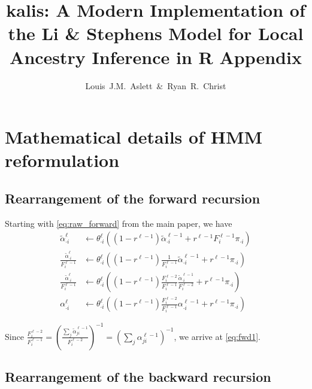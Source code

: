 \documentclass[a4paper]{article}
\title{kalis: A Modern Implementation of the Li \& Stephens Model for Local Ancestry Inference in R \newline Appendix}
\author{Louis~J.M.~Aslett~\&~Ryan~R.~Christ}
\date{}
\begin{document}
\maketitle
\appendix



\section{Mathematical details of HMM reformulation}
\label{mathematical-details-of-hmm-reformulation}



\subsection{Rearrangement of the forward recursion}
\label{apx:fwd}

Starting with \eqref{eq:raw_forward} from the main paper, we have
\begin{align}
	\tilde{\alpha}_{\cdot i}^{\ell} & \gets \theta^{\ell}_{\cdot i}  \left( \left(1-r^{\ell-1}\right) \tilde{\alpha}_{\cdot i}^{\ell-1} + r^{\ell-1} F_i^{\ell-1}  \pi_{\cdot i} \right) \nonumber \\
	\frac{\tilde{\alpha}_{\cdot i}^{\ell}}{ F_i^{\ell-1}} & \gets \theta^{\ell}_{\cdot i} \left( \left(1-r^{\ell-1}\right) \frac{1}{{ F_i^{\ell-1}}}\tilde{\alpha}_{\cdot i}^{\ell-1} + r^{\ell-1} \pi_{\cdot i} \right) \nonumber \\
	\frac{\tilde{\alpha}_{\cdot i}^{\ell}}{ F_i^{\ell-1}} & \gets \theta^{\ell}_{\cdot i} \left( \left(1-r^{\ell-1}\right) \frac{F_i^{\ell-2}}{{ F_i^{\ell-1}}} \frac{\tilde{\alpha}_{\cdot i}^{\ell-1}}{F_i^{\ell-2}} + r^{\ell-1} \pi_{\cdot i} \right) \nonumber \\
	\alpha_{\cdot i}^{\ell} & \gets \theta^{\ell}_{\cdot i} \left( \left(1-r^{\ell-1}\right) \frac{F_i^{\ell-2}}{{ F_i^{\ell-1}}} \alpha_{\cdot i}^{\ell-1} + r^{\ell-1} \pi_{\cdot i} \right) \nonumber
\end{align}

Since
\(\frac{F_i^{\ell-2}}{F_i^{\ell-1}} = \left( \frac{ \underset{j}{\sum} \tilde{\alpha}_{ji}^{\ell-1}}{ F_i^{\ell-2}}\right)^{-1} = \left( \underset{j}{\sum} \alpha_{ji}^{\ell-1} \right)^{-1}\),
we arrive at \eqref{eq:fwd1}.



\subsection{Rearrangement of the backward recursion}
\label{apx:bck}
\end{document}
